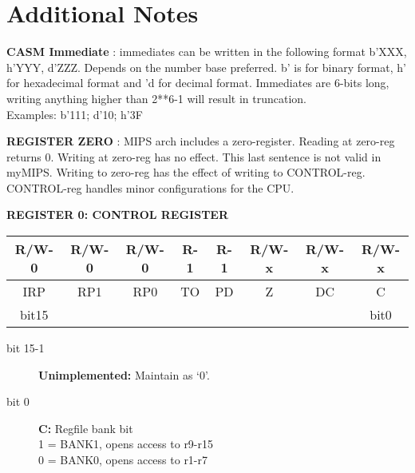 \documentclass[a4paper,11pt]{article}
\begin{document}
	\section*{Additional Notes}
	
	\textbf{CASM Immediate} : immediates can be written in the following format b'XXX, h'YYY, d'ZZZ. Depends on the number base preferred. b' is for binary format, h' for hexadecimal format and 'd for decimal format. Immediates are 6-bits long, writing anything higher than 2**6-1 will result in truncation. \\
	Examples: b'111; d'10; h'3F
	
	\textbf{REGISTER ZERO} : MIPS arch includes a zero-register. Reading at zero-reg returns 0. Writing at zero-reg has no effect. This last sentence is not valid in myMIPS. Writing to zero-reg has the effect of writing to CONTROL-reg. CONTROL-reg handles minor configurations for the CPU.
	
	\vspace{0.3cm}
	
	\noindent \textbf{REGISTER 0: \hspace{0.3cm} CONTROL REGISTER}
	
	\renewcommand{\arraystretch}{1.3}
	\setlength{\tabcolsep}{8pt}
	\begin{tabular}{|c|c|c|c|c|c|c|c|}
		\hline
		R/W-0 & R/W-0 & R/W-0 & R-1 & R-1 & R/W-x & R/W-x & R/W-x \\
		\hline
		IRP & RP1 & RP0 & TO & PD & Z & DC & C \\
		\hline
		bit15 &  &  &  &  &  &  & bit0 \\
		\hline
	\end{tabular}
	
	\vspace{0.3cm}
	
	\begin{description}
		\item[bit 15-1] \textbf{Unimplemented:} Maintain as ‘0’.
		
		
		\item[bit 0] \textbf{C:} Regfile bank bit \\
		\hspace*{0.5cm} 1 = BANK1, opens access to r9-r15 \\
		\hspace*{0.5cm} 0 = BANK0, opens access to r1-r7
	\end{description}
	
	\vspace{0.2cm}
	
\end{document}
